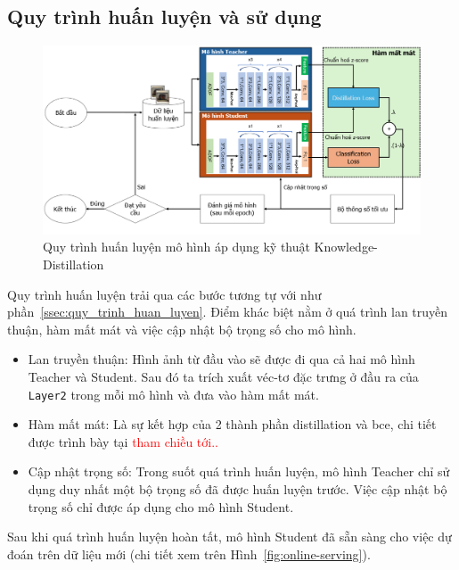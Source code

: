 \subsection{Quy trình huấn luyện và sử dụng}
%
\begin{figure}[h!]
	\centering
	\includegraphics[width=1.0\linewidth]{Images/offline-training-process-distillation.png}
	\begin{minipage}{1.0\linewidth}
		\vspace{5mm}
		\caption{Quy trình huấn luyện mô hình áp dụng kỹ thuật Knowledge-Distillation}
		\label{fig:offline-training-process-distillation}
	\end{minipage}
\end{figure}
%
%
Quy trình huấn luyện trải qua các bước tương tự với như phần~\ref{ssec:quy_trinh_huan_luyen}.
%
Điểm khác biệt nằm ở quá trình lan truyền thuận, hàm mất mát và việc cập nhật bộ trọng số cho mô hình.
%
\begin{itemize}
	\item Lan truyền thuận: Hình ảnh từ đầu vào sẽ được đi qua cả hai mô hình Teacher và Student. Sau đó ta trích xuất véc-tơ đặc trưng ở đầu ra của \texttt{Layer2} trong mỗi mô hình và đưa vào hàm mất mát.
	
	\item  Hàm mất mát: Là sự kết hợp của 2 thành phần \gls{distillation} và \gls{bce}, chi tiết được trình bày tại \textcolor{red}{tham chiều tới..}
	
	\item Cập nhật trọng số: Trong suốt quá trình huấn luyện, mô hình Teacher chỉ sử dụng duy nhất một bộ trọng số đã được huấn luyện trước. Việc cập nhật bộ trọng số chỉ được áp dụng cho mô hình Student.
\end{itemize}

Sau khi quá trình huấn luyện hoàn tất, mô hình Student đã sẵn sàng cho việc dự đoán trên dữ liệu mới (chi tiết xem trên Hình~\ref{fig:online-serving}). 







